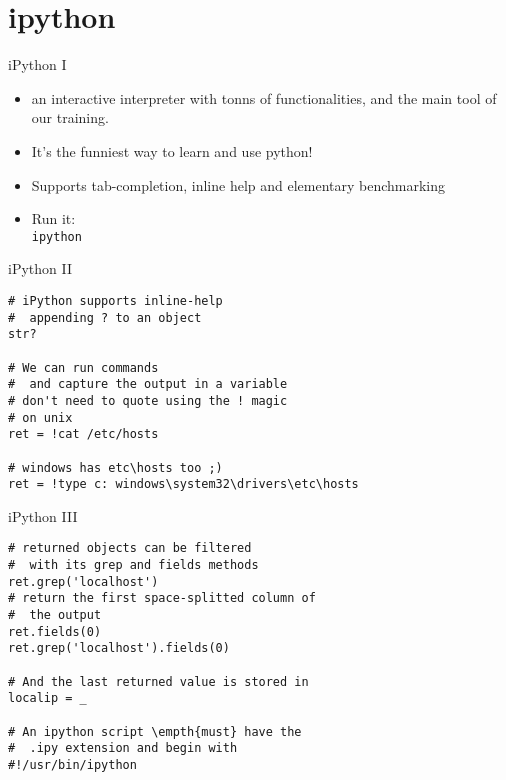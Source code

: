 \section{ipython}



\begin{frame}{iPython I}
\begin{itemize}
\item an interactive interpreter with tonns of                                                                                                        functionalities, and the main tool of our training.                                                                                                      

\item   It's the funniest way to learn and use python!

\item   Supports tab-completion, inline help and elementary
    benchmarking

\item   Run it: \\
\texttt{ipython}
\end{itemize}

\end{frame}


\begin{frame}[fragile]{iPython II}
\begin{verbatim}
# iPython supports inline-help
#  appending ? to an object
str?

# We can run commands
#  and capture the output in a variable
# don't need to quote using the ! magic
# on unix
ret = !cat /etc/hosts

# windows has etc\hosts too ;)
ret = !type c: windows\system32\drivers\etc\hosts
\end{verbatim}
\end{frame}


\begin{frame}[fragile]{iPython III}
\begin{verbatim}
# returned objects can be filtered
#  with its grep and fields methods
ret.grep('localhost')
# return the first space-splitted column of
#  the output
ret.fields(0)
ret.grep('localhost').fields(0)

# And the last returned value is stored in 
localip = _

# An ipython script \empth{must} have the 
#  .ipy extension and begin with
#!/usr/bin/ipython 
\end{verbatim}
\end{frame}

